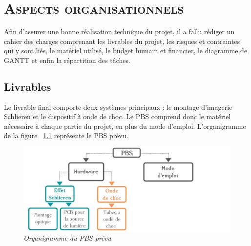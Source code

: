 \renewcommand{\chaptername}{\scshape Partie}
\chapter{\normalfont \scshape Aspects organisationnels}
Afin d'assurer une bonne réalisation technique du projet, il a fallu rédiger un cahier des charges comprenant les livrables du projet, les risques et contraintes qui y sont liés, le matériel utilisé, le budget humain et financier, le diagramme de GANTT et enfin la répartition des tâches.
\section{Livrables }
Le livrable final comporte deux systèmes principaux : le montage d'imagerie Schlieren et le dispositif à onde de choc. Le PBS comprend donc le matériel nécessaire à chaque partie du projet, en plus du mode d'emploi. L'organigramme de la figure ~\ref{fig:PBS} représente le PBS prévu.
\begin{figure}[H]
	\begin{center}
		\includegraphics[scale = 0.2]{figures/PBS.jpg}
	\end{center}
	\caption{\small{\textit{Organigramme du PBS prévu}}}
	\label{fig:PBS}
\end{figure}
